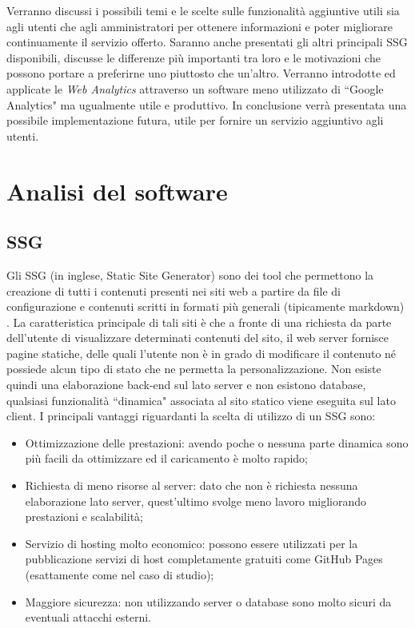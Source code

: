\documentclass[target=bach,aauheader=]{thud}
\begin{document}
Verranno discussi i possibili temi e le scelte sulle funzionalità aggiuntive utili sia agli utenti che agli amministratori per ottenere informazioni e poter migliorare continuamente il servizio offerto.  
\newline \newline
Saranno anche presentati gli altri principali SSG disponibili, discusse le differenze più importanti tra loro e le motivazioni che possono portare a preferirne uno piuttosto che un'altro.  
Verranno introdotte ed applicate le \textit{Web Analytics} attraverso un software meno utilizzato di ``Google Analytics" ma ugualmente utile e produttivo.
In conclusione verrà presentata una possibile implementazione futura, utile per fornire un servizio aggiuntivo agli utenti.   

\chapter{Analisi del software}

\section{SSG}\label{sec:SSG}
Gli SSG (in inglese, Static Site Generator) sono dei tool che permettono la creazione di tutti i contenuti presenti nei siti web a partire da file di configurazione e contenuti scritti in formati più generali (tipicamente markdown) \cite{camden2017working}.
La caratteristica principale di tali siti è che a fronte di una richiesta da parte dell'utente di visualizzare determinati contenuti del sito, il web server fornisce pagine statiche, delle quali l'utente non è in grado di modificare il contenuto né possiede alcun tipo di stato che ne permetta la personalizzazione. Non esiste quindi una elaborazione back-end sul lato server e non esistono database, qualsiasi funzionalità ``dinamica" associata al sito statico viene eseguita sul lato client. \newline
I principali vantaggi riguardanti la scelta di utilizzo di un SSG sono:
\begin{itemize}
\item Ottimizzazione delle prestazioni: avendo poche o nessuna parte dinamica sono più facili da ottimizzare ed il caricamento è molto rapido;
\item Richiesta di meno risorse al server: dato che non è richiesta nessuna elaborazione lato server, quest'ultimo svolge meno lavoro migliorando prestazioni e scalabilità;
\item Servizio di hosting molto economico: possono essere utilizzati per la pubblicazione servizi di host completamente gratuiti come GitHub Pages (esattamente come nel caso di studio);
\item Maggiore sicurezza: non utilizzando server o database sono molto sicuri da eventuali attacchi esterni.
\end{itemize}
\end{document}
